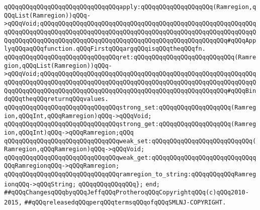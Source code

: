 \newline
\verb|qQQqqQQqqQQqqQQqqQQqqQQqqQQqqQQqapply:qQQqqQQqqQQqqQQqqQQq(Ramregion,qQQqList(Ramregion))qQQq->qQQqVoid;qQQqqQQqqQQqqQQqqQQqqQQqqQQqqQQqqQQqqQQqqQQqqQQqqQQqqQQqqQQqqQQqqQQqqQQqqQQqqQQqqQQqqQQqqQQqqQQqqQQqqQQqqQQqqQQqqQQqqQQqqQQqqQQqqQQqqQQqqQQqqQQqqQQqqQQqqQQqqQQqqQQqqQQqqQQqqQQqqQQqqQQqqQQqqQQq#qQQqApplyqQQqaqQQqfunction.qQQqFirstqQQqargqQQqisqQQqtheqQQqfn.|\newline
\verb|qQQqqQQqqQQqqQQqqQQqqQQqqQQqqQQqret:qQQqqQQqqQQqqQQqqQQqqQQqqQQq(Ramregion,qQQqList(Ramregion))qQQq->qQQqVoid;qQQqqQQqqQQqqQQqqQQqqQQqqQQqqQQqqQQqqQQqqQQqqQQqqQQqqQQqqQQqqQQqqQQqqQQqqQQqqQQqqQQqqQQqqQQqqQQqqQQqqQQqqQQqqQQqqQQqqQQqqQQqqQQqqQQqqQQqqQQqqQQqqQQqqQQqqQQqqQQqqQQqqQQqqQQqqQQqqQQqqQQqqQQqqQQq#qQQqBindqQQqtheqQQqreturnqQQqvalues.|\newline
\newline
\verb|qQQqqQQqqQQqqQQqqQQqqQQqqQQqqQQqstrong_set:qQQqqQQqqQQqqQQqqQQq(Ramregion,qQQqInt,qQQqRamregion)qQQq->qQQqVoid;|\newline
\verb|qQQqqQQqqQQqqQQqqQQqqQQqqQQqqQQqstrong_get:qQQqqQQqqQQqqQQqqQQq(Ramregion,qQQqInt)qQQq->qQQqRamregion;qQQq|\newline
\verb|qQQqqQQqqQQqqQQqqQQqqQQqqQQqqQQqweak_set:qQQqqQQqqQQqqQQqqQQqqQQqqQQq(Ramregion,qQQqRamregion)qQQq->qQQqVoid;|\newline
\verb|qQQqqQQqqQQqqQQqqQQqqQQqqQQqqQQqweak_get:qQQqqQQqqQQqqQQqqQQqqQQqqQQqqQQqRamregionqQQq->qQQqRamregion;|\newline
\newline
\verb|qQQqqQQqqQQqqQQqqQQqqQQqqQQqqQQqramregion_to_string:qQQqqQQqqQQqRamregionqQQq->qQQqString;|\newline
\verb|qQQqqQQqqQQqqQQq};|\newline
\verb|end;|\newline
\newline
\newline
\verb|##qQQqChangesqQQqbyqQQqJeffqQQqProtheroqQQqCopyrightqQQq(c)qQQq2010-2015,|\newline
\verb|##qQQqreleasedqQQqperqQQqtermsqQQqofqQQqSMLNJ-COPYRIGHT.|\newline

